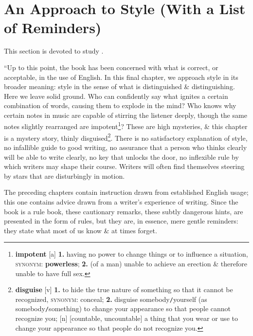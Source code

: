 \documentclass[oneside]{book}
\numberwithin{equation}{section}
\begin{document}
\section{An Approach to Style (With a List of Reminders)}
This section is devoted to study \cite[Chap. 5]{Strunk_White2019}.

``Up to this point, the book has been concerned with what is correct, or acceptable, in the use of English. In this final chapter, we approach style in its broader meaning: style in the sense of what is distinguished \& distinguishing. Here we leave solid ground. Who can confidently say what ignites a certain combination of words, causing them to explode in the mind? Who knows why certain notes in music are capable of stirring the listener deeply, though the same notes slightly rearranged are impotent\footnote{\textbf{impotent} [a] \textbf{1.} having no power to change things or to influence a situation, \textsc{synonym}: \textbf{powerless}; \textbf{2.} (of a man) unable to achieve an erection \& therefore unable to have full sex.}? These are high mysteries, \& this chapter is a mystery story, thinly disguised\footnote{\textbf{disguise} [v] \textbf{1.} to hide the true nature of something so that it cannot be recognized, \textsc{synonym}: conceal; \textbf{2.} disguise somebody\texttt{/}yourself (as somebody\texttt{/}something) to change your appearance so that people cannot recognize you; [n] [countable, uncountable] a thing that you wear or use to change your appearance so that people do not recognize you.}. There is no satisfactory explanation of style, no infallible guide to good writing, no assurance that a person who thinks clearly will be able to write clearly, no key that unlocks the door, no inflexible rule by which writers may shape their course. Writers will often find themselves steering by stars that are disturbingly in motion.

The preceding chapters contain instruction drawn from established English usage; this one contains advice drawn from a writer's experience of writing. Since the book is a rule book, these cautionary remarks, these subtly dangerous hints, are presented in the form of rules, but they are, in essence, mere gentle reminders: they state what most of us know \& at times forget.
\end{document}
